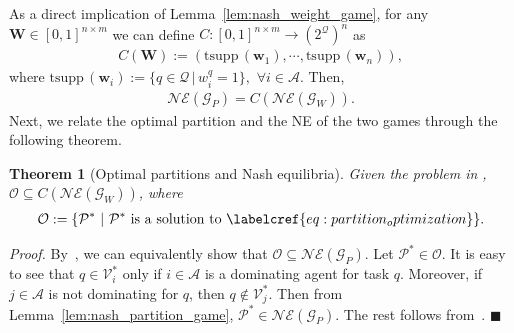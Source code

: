 \documentclass{IEEEtran}
\newcommand{\ldef}{:=}
\newcommand{\Mcal}[1]{\mathcal{#1}}
\newcommand{\Mc}[1]{\mathcal{#1}}
\newcommand{\bld}[1]{\mathbf{#1}}
\newcommand{\thmtitle}[1]{\mbox{}\emph{(#1).}}
\newtheorem{theorem}{Theorem}[section]
\newcommand{\squaresym}{\hbox{$\blacksquare$}}
\newcommand{\proofend}{\relax\ifmmode\else\unskip\hfill\fi\squaresym}
\renewenvironment{proof}{\textit{Proof.} }{\proofend}
\newcommand{\marginn}[1]{\marginpar{\color{blue}\tiny\ttfamily#1}}
\newcommand{\margin}[1]{\marginpar{\color{magenta}\tiny\ttfamily#1}}
\def \agt{\Mcal{A}}
\def \alloc{\Mcal{V}}
\def \game{\mathscr{G}}
\def \ne{\Mc{NE}}
\def \opt{\Mc{O}}
\def \salloc{\Mc{P}}
\def \setfunc{C}
\def \supp{\mathrm{tsupp}\,}
\def \tsk{\Mc{Q}}
\def \w{\bld{w}}
\def \W{\bld{W}}
\begin{document}
As a direct implication of Lemma~\ref{lem:nash_weight_game}, for any
$\W \in [0,1]^{n \times m}$ we can define
$\setfunc : [0,1]^{n \times m} \to (2^\tsk)^n$ as
\begin{align}
	\setfunc(\W) \ldef (\supp(\w_1),\cdots,\supp(\w_n)),
	\label{eq:setfunc}	
\end{align}
where
$\supp(\w_i) \ldef \{q \in \tsk \,|\, w^q_i = 1\},\,\, \forall i\in
\agt$.
Then, 
\begin{align}
	\ne(\game_P) = \setfunc(\ne(\game_W)).
	\label{eq:equivalent}
\end{align}
Next, we %
relate the optimal partition and the NE of the two games through the
following theorem.

\begin{theorem}[Optimal partitions and Nash equilibria]\label{th:opt_subset_ne}
Given the problem in  , $\opt \subseteq \setfunc(\ne(\game_W))$, where
\begin{align}
	\opt \ldef \{\salloc^* \,\,|\,\, \salloc^* \,\, \mathrm{is\,\, a\,\, solution\,\, to\,\,}\labelcref{eq:partition_optimization} \}.
	\label{eq:opt}
\end{align}
\end{theorem}
\begin{proof}
	By~, we can equivalently show that $\opt \subseteq \ne(\game_P)$. Let $\salloc^* \in \opt$. It is easy to see that $q \in \alloc^*_i$ only if $i \in \agt$ is a dominating agent for task $q$. Moreover, if $j \in \agt$ is not dominating for $q$, then $q \notin \alloc^*_j$. Then from Lemma~\ref{lem:nash_partition_game}, $\salloc^* \in \ne(\game_P)$. The rest follows from~.
\end{proof}
\end{document}
